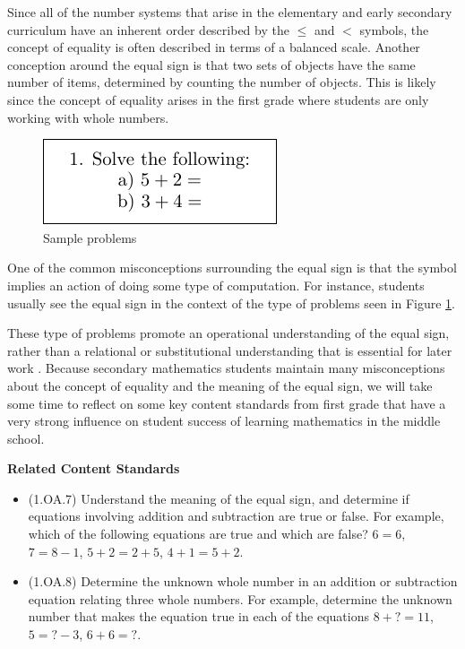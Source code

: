\documentclass[
]{book}
\providecommand{\tightlist}{%
  \setlength{\itemsep}{0pt}\setlength{\parskip}{0pt}}
\newenvironment{standards}{}{}
\theoremstyle{definition}
\theoremstyle{definition}
\theoremstyle{definition}
\theoremstyle{definition}
\theoremstyle{remark}
\begin{document}
Since all of the number systems that arise in the elementary and early secondary curriculum have an inherent order described by the \(\leq\) and \(<\) symbols, the concept of equality is often described in terms of a balanced scale. Another conception around the equal sign is that two sets of objects have the same number of items, determined by counting the number of objects. This is likely since the concept of equality arises in the first grade where students are only working with whole numbers.

\begin{figure}

{\centering \includegraphics[width=0.35\linewidth]{tikz/sample_addition_problem} 

}

\caption{Sample problems}\label{fig:equality-operation}
\end{figure}

One of the common misconceptions surrounding the equal sign is that the symbol implies an action of doing some type of computation. For instance, students usually see the equal sign in the context of the type of problems seen in Figure \ref{fig:equality-operation}.

These type of problems promote an operational understanding of the equal sign, rather than a relational or substitutional understanding that is essential for later work \citep[pp.~145-150]{Cognition}. Because secondary mathematics students maintain many misconceptions about the concept of equality and the meaning of the equal sign, we will take some time to reflect on some key content standards from first grade that have a very strong influence on student success of learning mathematics in the middle school.

\begin{standards}

\begin{center}
\textbf{Related Content Standards}

\end{center}

\begin{itemize}
\tightlist
\item
  (1.OA.7) Understand the meaning of the equal sign, and determine if equations involving addition and subtraction are true or false. For example, which of the following equations are true and which are false? \(6 = 6\), \(7 = 8 - 1\), \(5 + 2 = 2 + 5\), \(4 + 1 = 5 + 2\).
\item
  (1.OA.8) Determine the unknown whole number in an addition or subtraction equation relating three whole numbers. For example, determine the unknown number that makes the equation true in each of the equations \(8 + ? = 11\), \(5 = ? - 3\), \(6 + 6 = ?\).
\end{itemize}

\end{standards}
\end{document}
